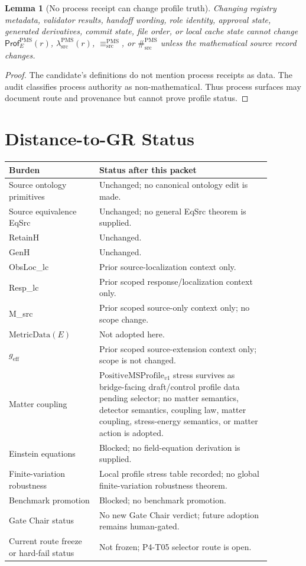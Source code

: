 \documentclass[11pt]{article}
\newcommand{\PMSProf}{\mathrm{PositiveMSProfile}_{v1}}
\newcommand{\Prof}{\mathsf{Prof}^{\mathrm{PMS}}_E}
\newcommand{\lambdaProf}{\lambda^{\mathrm{PMS}}_{\mathrm{src}}}
\newcommand{\EqProf}{\equiv^{\mathrm{PMS}}_{\mathrm{src}}}
\newcommand{\SepProf}{\#^{\mathrm{PMS}}_{\mathrm{src}}}
\newcommand{\MetricData}{\mathrm{MetricData}}
\newcommand{\geff}{g_{\mathrm{eff}}}
\newtheorem{lemma}{Lemma}
\begin{document}
\begin{lemma}[No process receipt can change profile truth]
Changing registry metadata, validator results, handoff wording, role identity,
approval state, generated derivatives, commit state, file order, or local
cache state cannot change \(\Prof(r)\), \(\lambdaProf(r)\), \(\EqProf\), or
\(\SepProf\) unless the mathematical source record changes.
\end{lemma}

\begin{proof}
The candidate's definitions do not mention process receipts as data. The audit
classifies process authority as non-mathematical. Thus process surfaces may
document route and provenance but cannot prove profile status.
\end{proof}

\section{Distance-to-GR Status}

\begin{longtable}{p{0.30\linewidth}p{0.58\linewidth}}
\toprule
Burden & Status after this packet \\
\midrule
Source ontology primitives & Unchanged; no canonical ontology edit is made. \\
Source equivalence EqSrc & Unchanged; no general EqSrc theorem is supplied. \\
RetainH & Unchanged. \\
GenH & Unchanged. \\
ObsLoc\_lc & Prior source-localization context only. \\
Resp\_lc & Prior scoped response/localization context only. \\
M\_src & Prior scoped source-only context only; no scope change. \\
\(\MetricData(E)\) & Not adopted here. \\
\(\geff\) & Prior scoped source-extension context only; scope is not changed. \\
Matter coupling & \(\PMSProf\) stress survives as bridge-facing draft/control
profile data pending selector; no matter semantics, detector semantics,
coupling law, matter coupling, stress-energy semantics, or matter action is
adopted. \\
Einstein equations & Blocked; no field-equation derivation is supplied. \\
Finite-variation robustness & Local profile stress table recorded; no global
finite-variation robustness theorem. \\
Benchmark promotion & Blocked; no benchmark promotion. \\
Gate Chair status & No new Gate Chair verdict; future adoption remains
human-gated. \\
Current route freeze or hard-fail status & Not frozen; P4-T05 selector route
is open. \\
\bottomrule
\end{longtable}
\end{document}
